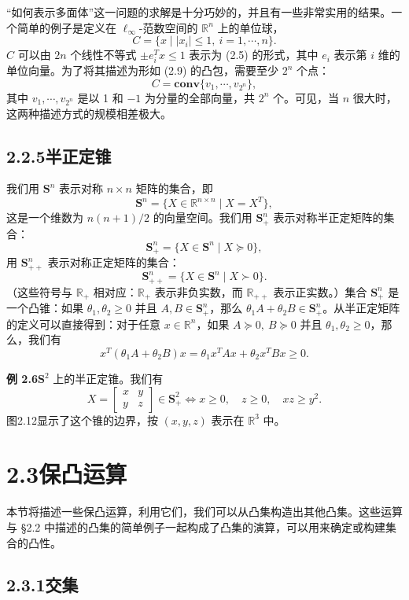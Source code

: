 \documentclass[UTF8,12pt,a4paper,fontset=fandol]{ctexart}
\begin{document}
``如何表示多面体''这一问题的求解是十分巧妙的，并且有一些非常实用的结果。一个简单的例子是定义在 $\ell_\infty$-范数空间的 $\mathbb{R}^n$ 上的单位球，
\[
  C=\{x\mid |x_i|\le 1,\ i=1,\cdots,n\}.
\]
$C$ 可以由 $2n$ 个线性不等式 $\pm e_i^Tx\le 1$ 表示为 (2.5) 的形式，其中 $e_i$ 表示第 $i$ 维的单位向量。为了将其描述为形如 (2.9) 的凸包，需要至少 $2^n$ 个点：
\[
  C=\mathbf{conv}\{v_1,\cdots,v_{2^n}\},
\]
其中 $v_1,\cdots,v_{2^n}$ 是以 1 和 $-1$ 为分量的全部向量，共 $2^n$ 个。可见，当 $n$ 很大时，这两种描述方式的规模相差极大。

\subsection*{2.2.5\quad 半正定锥}

我们用 $\mathbf{S}^n$ 表示对称 $n\times n$ 矩阵的集合，即
\[
  \mathbf{S}^n=\{X\in\mathbb{R}^{n\times n}\mid X=X^T\},
\]
这是一个维数为 $n(n+1)/2$ 的向量空间。我们用 $\mathbf{S}_+^n$ 表示对称半正定矩阵的集合：
\[
  \mathbf{S}_+^n=\{X\in\mathbf{S}^n\mid X\succeq 0\},
\]
用 $\mathbf{S}_{++}^n$ 表示对称正定矩阵的集合：
\[
  \mathbf{S}_{++}^n=\{X\in\mathbf{S}^n\mid X\succ 0\}.
\]
（这些符号与 $\mathbb{R}_+$ 相对应：$\mathbb{R}_+$ 表示非负实数，而 $\mathbb{R}_{++}$ 表示正实数。）集合 $\mathbf{S}_+^n$ 是一个凸锥：如果 $\theta_1,\theta_2\ge 0$ 并且 $A,B\in\mathbf{S}_+^n$，那么 $\theta_1A+\theta_2B\in\mathbf{S}_+^n$。从半正定矩阵的定义可以直接得到：对于任意 $x\in\mathbb{R}^n$，如果 $A\succeq 0,\ B\succeq 0$ 并且 $\theta_1,\theta_2\ge 0$，那么，我们有
\[
  x^T(\theta_1A+\theta_2B)x=\theta_1x^TAx+\theta_2x^TBx\ge 0.
\]

\noindent\textbf{例 2.6}\quad $\mathbf{S}^2$ 上的半正定锥。我们有
\[
  X=
  \begin{bmatrix}
    x & y\\
    y & z
  \end{bmatrix}\in\mathbf{S}_+^2
  \Longleftrightarrow
  x\ge 0,\quad z\ge 0,\quad xz\ge y^2.
\]
图2.12显示了这个锥的边界，按 $(x,y,z)$ 表示在 $\mathbb{R}^3$ 中。

\section*{2.3\quad 保凸运算}

本节将描述一些保凸运算，利用它们，我们可以从凸集构造出其他凸集。这些运算与 §2.2 中描述的凸集的简单例子一起构成了凸集的演算，可以用来确定或构建集合的凸性。

\subsection*{2.3.1\quad 交集}
\end{document}
